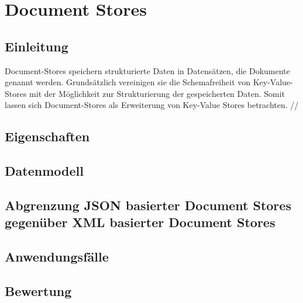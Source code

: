 \section{Document Stores}
\subsection{Einleitung}
Document-Stores speichern strukturierte Daten in Datensätzen, die Dokumente genannt werden. Grundsätzlich vereinigen sie die Schemafreiheit von Key-Value-Stores mit der Möglichkeit zur Strukturierung der gespeicherten Daten. Somit lassen sich Document-Stores als Erweiterung von Key-Value Stores betrachten. 
//
\subsection{Eigenschaften}

\subsection{Datenmodell}
\subsection{Abgrenzung JSON basierter Document Stores gegenüber XML basierter Document Stores}
\subsection{Anwendungsfälle}
\subsection{Bewertung}
